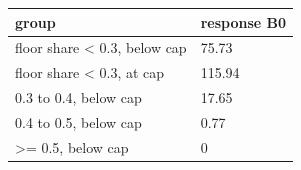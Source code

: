 \begingroup\small
\setlength{\tabcolsep}{3pt}
\renewcommand{\arraystretch}{1.04}
\begin{tabularx}{\linewidth}{XX}
\toprule
group & response B0 \\
\midrule
floor share \textless{} 0.3, below cap & 75.73 \\
floor share \textless{} 0.3, at cap & 115.94 \\
0.3 to 0.4, below cap & 17.65 \\
0.4 to 0.5, below cap & 0.77 \\
\textgreater{}= 0.5, below cap & 0 \\
\bottomrule
\end{tabularx}
\endgroup
